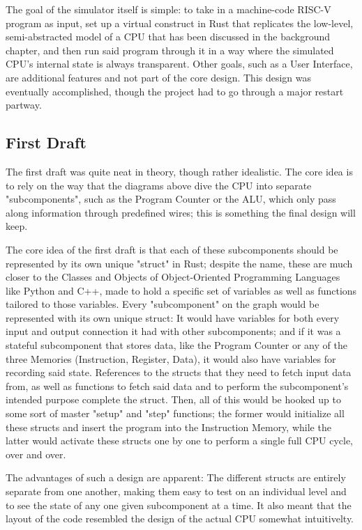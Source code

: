 \documentclass[12pt,twoside]{reedthesis}
\begin{document}
The goal of the simulator itself is simple: to take in a machine-code RISC-V program as input, set up a virtual construct in Rust that replicates the low-level, semi-abstracted model of a CPU that has been discussed in the background chapter, and then run said program through it in a way where the simulated CPU's internal state is always transparent. Other goals, such as a User Interface, are additional features and not part of the core design. This design was eventually accomplished, though the project had to go through a major restart partway.

\subsection{First Draft}

The first draft was quite neat in theory, though rather idealistic. The core idea is to rely on the way that the diagrams above dive the CPU into separate "subcomponents", such as the Program Counter or the ALU, which only pass along information through predefined wires; this is something the final design will keep.

The core idea of the first draft is that each of these subcomponents should be represented by its own unique "struct" in Rust; despite the name, these are much closer to the Classes and Objects of Object-Oriented Programming Languages like Python and C++, made to hold a specific set of variables as well as functions tailored to those variables. Every "subcomponent" on the graph would be represented with its own unique struct: It would have variables for both every input and output connection it had with other subcomponents; and if it was a stateful subcomponent that stores data, like the Program Counter or any of the three Memories (Instruction, Register, Data), it would also have variables for recording said state. References to the structs that they need to fetch input data from, as well as functions to fetch said data and to perform the subcomponent's intended purpose complete the struct. Then, all of this would be hooked up to some sort of master "setup" and "step" functions; the former would initialize all these structs and insert the program into the Instruction Memory, while the latter would activate these structs one by one to perform a single full CPU cycle, over and over.

The advantages of such a design are apparent: The different structs are entirely separate from one another, making them easy to test on an individual level and to see the state of any one given subcomponent at a time. It also meant that the layout of the code resembled the design of the actual CPU somewhat intuitivelty.
\end{document}
